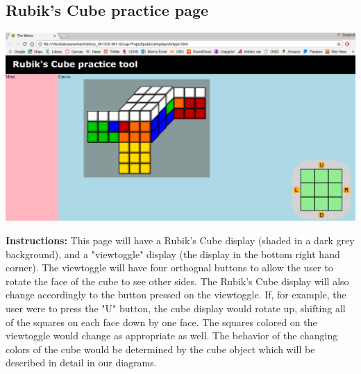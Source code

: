 \documentclass[12pt]{article}
\begin{document}
	\subsection{Rubik's Cube practice page}
	\includegraphics[width = \textwidth]{cubepage.PNG}
	\par
	\textbf{Instructions:} This page will have a Rubik's Cube display (shaded in a dark grey background), and a "viewtoggle" display (the display in the bottom right hand corner). The viewtoggle will have four orthognal buttons to allow the user to rotate the face of the cube to see other sides. The Rubik's Cube display will also change accordingly to the button pressed on the viewtoggle. If, for example, the user were to press the "U" button, the cube display would rotate up, shifting all of the squares on each face down by one face. The squares colored on the viewtoggle would change as appropriate as well. The behavior of the changing colors of the cube would be determined by the cube object which will be described in detail in our diagrams. \\
	
\end{document}
